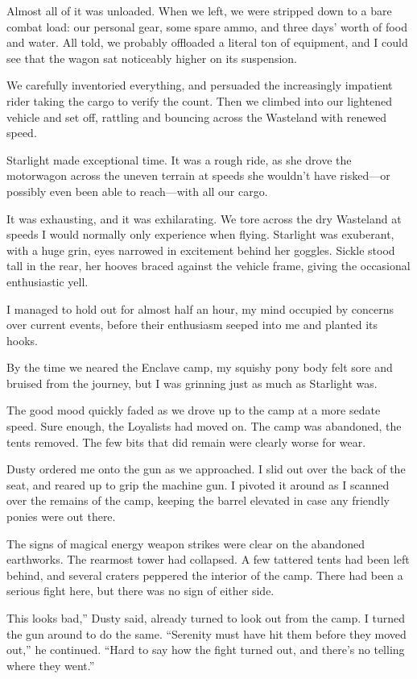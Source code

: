 Almost all of it was unloaded. When we left, we were stripped down to a bare combat load: our personal gear, some spare ammo, and three days’ worth of food and water. All told, we probably offloaded a literal ton of equipment, and I could see that the wagon sat noticeably higher on its suspension.

We carefully inventoried everything, and persuaded the increasingly impatient rider taking the cargo to verify the count. Then we climbed into our lightened vehicle and set off, rattling and bouncing across the Wasteland with renewed speed.

{\br}%
Starlight made exceptional time. It was a rough ride, as she drove the motorwagon across the uneven terrain at speeds she wouldn’t have risked—or possibly even been able to reach—with all our cargo.

It was exhausting, and it was exhilarating. We tore across the dry Wasteland at speeds I would normally only experience when flying. Starlight was exuberant, with a huge grin, eyes narrowed in excitement behind her goggles. Sickle stood tall in the rear, her hooves braced against the vehicle frame, giving the occasional enthusiastic yell.

I managed to hold out for almost half an hour, my mind occupied by concerns over current events, before their enthusiasm seeped into me and planted its hooks.

By the time we neared the Enclave camp, my squishy pony body felt sore and bruised from the journey, but I was grinning just as much as Starlight was.

The good mood quickly faded as we drove up to the camp at a more sedate speed. Sure enough, the Loyalists had moved on. The camp was abandoned, the tents removed. The few bits that did remain were clearly worse for wear.

Dusty ordered me onto the gun as we approached. I slid out over the back of the seat, and reared up to grip the machine gun. I pivoted it around as I scanned over the remains of the camp, keeping the barrel elevated in case any friendly ponies were out there.

The signs of magical energy weapon strikes were clear on the abandoned earthworks. The rearmost tower had collapsed. A few tattered tents had been left behind, and several craters peppered the interior of the camp. There had been a serious fight here, but there was no sign of either side.

\leavevmode{}This looks bad,” Dusty said, already turned to look out from the camp. I turned the gun around to do the same. “Serenity must have hit them before they moved out,” he continued. “Hard to say how the fight turned out, and there’s no telling where they went.”

